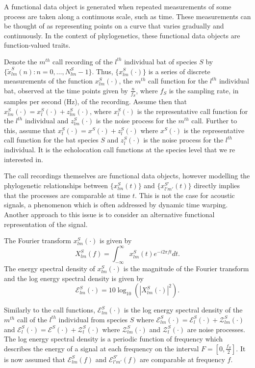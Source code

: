 \documentclass[wsdraft]{ws-rv9x6} %
\begin{document}
A functional data object is generated when repeated measurements of some process are taken along a continuous scale, such as time. \cite{ramsay2006functional} 
These measurements can be thought of as representing points on a curve that varies gradually and continuously. In the context of phylogenetics, these functional data objects are function-valued traits. \cite{meyer2005up}

Denote the \(m^{th}\) call recording of the \(l^{th}\) individual bat of species \(S\) by \(\{\tilde{x}_{lm}^S(n) : n = 0, \dots, N_{lm}^S - 1\}\). 
Thus, \(\{x_{lm}^S(\cdot)\}\) is a series of discrete measurements of the function \(x_{lm}^S(\cdot)\), the \(m^{th}\) call function for the \(l^{th}\) individual bat, observed at the time points given by \(\frac{n}{f_S}\), where \(f_S\) is the sampling rate, in samples per second (Hz), of the recording. Assume then that \(x_{lm}^S(\cdot) = x_{l}^S(\cdot) + z_{lm}^S(\cdot)\), where \(x_{l}^S(\cdot)\) is the representative call function for the \(l^{th}\) individual and \(z_{lm}^S(\cdot)\) is the noise process for the \(m^{th}\) call. Further to this, assume that \(x_{l}^S(\cdot) = x^S(\cdot) + z_{l}^S(\cdot)\) where \(x^S(\cdot)\) is the representative call function for the bat species \(S\) and \(z_{l}^S(\cdot)\) is the noise process for the \(l^{th}\) individual. It is the echolocation call functions at the species level that we re interested in.

The call recordings themselves are functional data objects, however modelling the phylogenetic relationships between \(\{x_{lm}^S(t)\}\) and \(\{x_{l'm'}^{S'}(t)\}\) directly implies that the processes are comparable at time \(t\). 
This is not the case for acoustic signals, a phenomenon which is often addressed by dynamic time warping.\cite{berndt1994using} Another approach to this issue is to consider an alternative functional representation of the signal. 

The Fourier transform \(x_{lm}^{S}(\cdot)\) is given by
\[
X_{lm}^S(f) = \int_{-\infty}^{\infty} x_{lm}^{S}(t) e^{-i 2\pi f t} dt.
\label{eqn:dft}
\]
The energy spectral density of \(x_{lm}^{S}(\cdot)\) is the magnitude of the Fourier transform and the log energy spectral density is given by
\begin{equation}
\mathcal{E}_{lm}^S(\cdot) = 10 \log_{10} \left( |X_{lm}^S(\cdot)|^2 \right).
\label{eqn:esd}
\end{equation}

Similarly to the call functions, \(\mathcal{E}_{lm}^S(\cdot)\) is the log energy spectral density of the \(m^{th}\) call of the \(l^{th}\) individual from species \(S\) where \(\mathcal{E}_{lm}^S(\cdot) = \mathcal{E}_{l}^S(\cdot) + \mathcal{Z}_{lm}^S(\cdot)\) and \(\mathcal{E}_{l}^S(\cdot) = \mathcal{E}^S(\cdot) + \mathcal{Z}_{l}^S(\cdot)\) where \(\mathcal{Z}_{lm}^S(\cdot)\) and \(\mathcal{Z}_{l}^S(\cdot)\) are noise processes.  The log energy spectral density is a periodic function of frequency which describes the energy of a signal at each frequency on the interval \(F = [0, \frac{f_S}{2}]\).\cite{antoniou2006digital} It is now assumed that \(\mathcal{E}_{lm}^S(f)\) and \(\mathcal{E}_{l'm'}^{S'}(f)\) are comparable at frequency \(f\).
\end{document}
